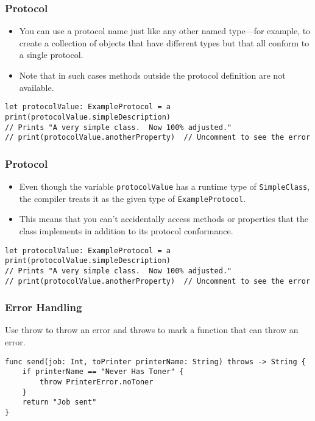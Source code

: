 \begin{frame}[fragile] \frametitle{Protocol}

\begin{itemize}
\item You can use a protocol name just like any other named type—for example, to create a collection of objects that have different types but that all conform to a single protocol.
\item Note that in such cases methods outside the protocol definition are not available.
\end{itemize}

\begin{lstlisting}
let protocolValue: ExampleProtocol = a
print(protocolValue.simpleDescription)
// Prints "A very simple class.  Now 100% adjusted."
// print(protocolValue.anotherProperty)  // Uncomment to see the error
\end{lstlisting}
\end{frame}

\begin{frame}[fragile] \frametitle{Protocol}

\begin{itemize}
\item Even though the variable \lstinline|protocolValue| has a runtime type of \lstinline|SimpleClass|, the compiler treats it as the given type of \lstinline|ExampleProtocol|. 
\item This means that you can’t accidentally access methods or properties that the class implements in addition to its protocol conformance.
\end{itemize}

\begin{lstlisting}
let protocolValue: ExampleProtocol = a
print(protocolValue.simpleDescription)
// Prints "A very simple class.  Now 100% adjusted."
// print(protocolValue.anotherProperty)  // Uncomment to see the error
\end{lstlisting}
\end{frame}

\begin{frame}[fragile] \frametitle{Error Handling}


Use throw to throw an error and throws to mark a function that can throw an error. 

\begin{lstlisting}
func send(job: Int, toPrinter printerName: String) throws -> String {
    if printerName == "Never Has Toner" {
        throw PrinterError.noToner
    }
    return "Job sent"
}
\end{lstlisting}


\end{frame}

